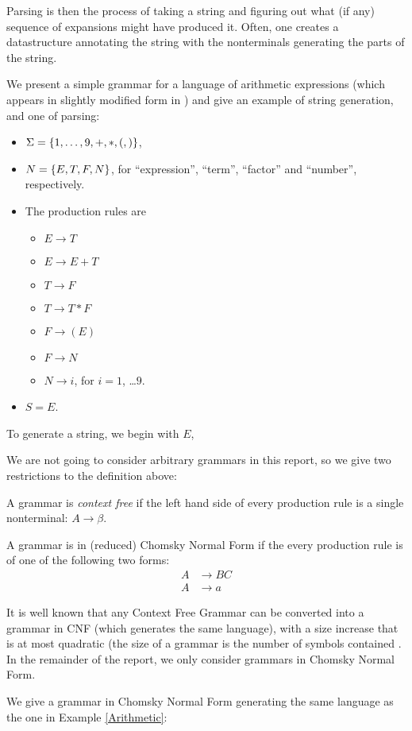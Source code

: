 Parsing is then the process of taking a string and figuring out what (if any) sequence of expansions might have produced it. Often, one creates a datastructure annotating the string with the nonterminals generating the parts of the string.
\begin{Example}
  \label{Arithmetic}
  We present a simple grammar for a language of arithmetic expressions (which appears in slightly modified form in \cite{Lange-Leiss}) and give an example of string generation, and one of parsing: 
  \begin{itemize}
  \item $\Sigma = \{1,\ldots , 9, +, *, (, )\}$,
  \item $N = \{E, T, F, N\}$, for ``expression'', ``term'', ``factor'' and ``number'', respectively.
  \item The production rules are
    \begin{itemize}
    \item $E \to T$
    \item $E \to E + T$
    \item $T \to F$
    \item $T \to T * F$ 
    \item $F \to ( E )$
    \item $F \to N$
    \item $N \to i$, for $i = 1$, \ldots $9$. 
    \end{itemize}
  \item $S = E$.
  \end{itemize}
  To generate a string, we begin with $E$, 
\end{Example}
We are not going to consider arbitrary grammars in this report, so we give two restrictions to the definition above: 
\begin{Definition}
  A grammar is \emph{context free} if the left hand side of every production rule is a single nonterminal: $A \to \beta$.
\end{Definition}
\begin{Definition}
  A grammar is in (reduced) Chomsky Normal Form \cite{Chomsky} if the every production rule is of one of the following two forms:
  \begin{align*}
  A &\to BC \\
  A &\to a
  \end{align*}
\end{Definition}
It is well known that any Context Free Grammar can be converted into a grammar in CNF (which generates the same language), with a size increase that is at most quadratic (the size of a grammar is the number of symbols contained \cite{Lange-Leiss}.
In the remainder of the report, we only consider grammars in Chomsky Normal Form.
\begin{Example}
  \label{CNF-Ex}
  We give a grammar in Chomsky Normal Form generating the same language as the one in Example \ref{Arithmetic}:
\end{Example}
